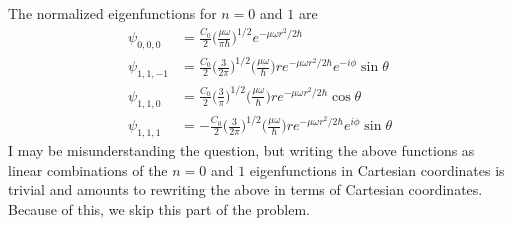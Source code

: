 \documentclass[../principles-of-quantum-mechanics.tex]{subfiles}
\begin{document}
\begin{questions}
\begin{solution}
			The normalized eigenfunctions for $n = 0$ and $1$ are
			\begin{align*}
				\psi_{0, 0, 0} &= \frac{C_0}{2}\Big(\frac{\mu\omega}{\pi\hbar}\Big)^{1/2}e^{-\mu\omega r^2/2\hbar} \\
				\psi_{1, 1, -1} &= \frac{C_0}{2}\Big(\frac{3}{2\pi}\Big)^{1/2}\Big(\frac{\mu\omega}{\hbar}\Big)r e^{-\mu\omega r^2/2\hbar}e^{-i\phi}\sin\theta \\
				\psi_{1, 1, 0} &= \frac{C_0}{2}\Big(\frac{3}{\pi}\Big)^{1/2}\Big(\frac{\mu\omega}{\hbar}\Big)r e^{-\mu\omega r^2/2\hbar}\cos\theta \\
				\psi_{1, 1, 1} &= {-\frac{C_0}{2}}\Big(\frac{3}{2\pi}\Big)^{1/2}\Big(\frac{\mu\omega}{\hbar}\Big)r e^{-\mu\omega r^2/2\hbar}e^{i\phi}\sin\theta
			\end{align*}
			I may be misunderstanding the question, but writing the above functions as linear combinations of the $n = 0$ and $1$ eigenfunctions in Cartesian coordinates is trivial and amounts to rewriting the above in terms of Cartesian coordinates. Because of this, we skip this part of the problem.
		\end{solution} 
	\end{questions}
\end{document}
